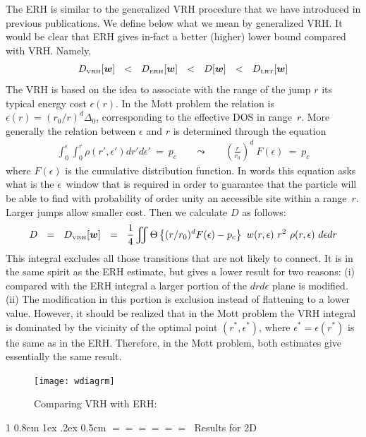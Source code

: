 \documentclass[onecolumn,fleqn,notitlepage,secnumarabic]{revtex4}
\makeatletter
\newcommand{\tbox}[1]{\mbox{\tiny #1}}
\newcommand{\beq}{\begin{eqnarray}}
\newcommand{\eeq}{\end{eqnarray}}
\def\section{%
  \@startsection
    {section}%
    {1}%
    {\z@}%
    {0.8cm \@plus1ex \@minus .2ex}%
    {0.5cm}%
    {\Large\bf $=\!=\!=\!=\!=\!=\;$}%
}%
\makeatother
\begin{document}
The ERH is similar to the generalized VRH procedure 
that we have introduced in previous publications.
We define below what we mean by generalized VRH. 
It would be clear that ERH gives in-fact a better (higher) 
lower bound compared with VRH. Namely, 
%
\beq
D_{\tbox{VRH}}[\bm{w}]  
\ \ < \ \ D_{\tbox{ERH}}[\bm{w}]
\ \ < \ \ D[\bm{w}]
\ \ < \ \ D_{\tbox{LRT}}[\bm{w}]
\eeq
%
The VRH is based on the idea to associate
with the range of the jump $r$ its typical 
energy cost $\epsilon(r)$. In the Mott problem 
the relation is $\epsilon(r) = (r_0/r)^d \Delta_0$, 
corresponding to the effective DOS in range~$r$. 
More generally the relation between $\epsilon$ and $r$ 
is determined through the equation 
%
\beq
\int_0^{\epsilon} \int_0^{r} \rho(r',\epsilon')  dr'd\epsilon' \  = \  p_c 
\ \ \ \ \ \ \ \ \leadsto \ \ \ \ \ \ \ \ 
\left(\frac{r}{r_0}\right)^d \ F(\epsilon) \ = \ p_c
\eeq
%
where $F(\epsilon)$ is the cumulative distribution function.
In words this equation asks what is the $\epsilon$~window that 
is required in order to guarantee that the particle will be able 
to find with probability of order unity an accessible site within 
a range~$r$. Larger jumps allow smaller cost. 
Then we calculate $D$ as follows: 
%
\beq
D \ \ = \ \ D_{\tbox{VRH}}[\bm{w}]  \ \ = \ \ 
\frac{1}{4}\iint \Theta\left\{ (r/r_0)^d F(\epsilon) - p_c \right\} \ w(r,\epsilon) \ r^2  \ \rho(r,\epsilon) \ d\epsilon dr
\eeq
%
This integral excludes all those transitions that are not likely to connect. 
It is in the same spirit as the ERH estimate, but gives a lower result 
for two reasons: (i) compared with the ERH integral a larger portion of 
the $drd\epsilon$ plane is modified. (ii) The modification in this portion 
is exclusion instead of flattening to a lower value.
However, it should be realized that in the Mott problem the VRH 
integral is dominated by the vicinity of the optimal point ${(r^*,\epsilon^*)}$, 
where $\epsilon^*=\epsilon(r^*)$ is the same as in the ERH. 
Therefore, in the Mott problem, both estimates give essentially the same result.

\begin{figure}[H]
\texttt{[image: wdiagrm]}
\caption{ Comparing VRH with ERH: }
\end{figure}


\section{Results for 2D}\label{sec:diff2d}
\end{document}
